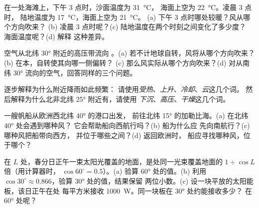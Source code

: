 \begin{exercise}[$\star\star$]\label{exo:g8:winds-global-circulation:7}
在一处海滩上，下午 3 点时，沙面温度为 \qty{31}{\degreeCelsius}，
海面上空为 \qty{22}{\degreeCelsius}。凌晨 3 点时，
陆地温度为 \qty{17}{\degreeCelsius}，海面上空为 \qty{21}{\degreeCelsius}。
(a) 下午 3 点时哪处较暖？风从哪个方向吹来？
(b) 凌晨 3 点时呢？(c) 陆地温度在两个时刻之间变化了多少度？
海面温度呢？(d) 解释
这种差异。
\end{exercise}

\begin{exercise}[$\star\star$]\label{exo:g8:winds-global-circulation:8}
空气从北纬 \ang{30} 附近的高压带流向
。(a) 若不计地球自转，风将从哪个方向吹来？
(b) 在本，自转使其向哪一侧偏转？
(c) 那么风实际从哪个方向吹来？(d) 对从南纬 \ang{30}
流向的空气，回答同样的三个问题。
\end{exercise}

\begin{exercise}[$\star\star$]\label{exo:g8:winds-global-circulation:9}
逐步解释为什么附近降雨如此频繁：
请使用\emph{受热}、\emph{上升}、\emph{冷却}、\emph{云}这几个词。
然后解释为什么北非北纬 \ang{25} 附近有，请使用
\emph{下沉}、\emph{高压}、\emph{干燥}这几个词。
\end{exercise}

\begin{exercise}[$\star\star$]\label{exo:g8:winds-global-circulation:10}
一艘帆船从欧洲西北纬 \ang{40} 的港口出发，
前往北纬 \ang{15} 的加勒比海。(a) 在北纬 \ang{40} 处会遇到哪种风？
它会帮助船向西航行吗？(b) 船为什么应
先向南航行？(c) 哪种风把船带向西方，
并位于哪些之间？(d) 返回欧洲时，
船应寻找哪种风，位于哪个？
\end{exercise}

\begin{exercise}[$\star\star\star$]\label{exo:g8:winds-global-circulation:11}
在 $L$ 处，春分日正午一束太阳光覆盖的地面，是处同一光束覆盖地面的 $1 \div
\cos L$ 倍（用计算器时，
$\cos 60^\circ = 0.5$）。(a) 验算 \ang{60} 处的值。(b) 利用
$\cos 30^\circ \approx 0.866$，验算 \ang{30} 处的值，结果保留
两位小数。(c) 设一块平放的太阳能板，该日正午在处
每平方米接收 \qty{1000}{W}。同一块板在 \ang{30} 处约能接收多少？
在 \ang{60} 处呢？
\end{exercise}

